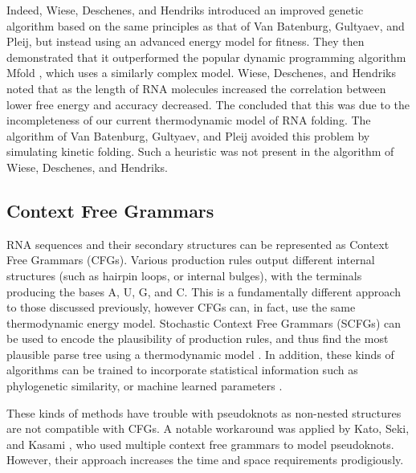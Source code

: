 \documentclass{cshonours}
\begin{document}
Indeed, Wiese, Deschenes, and Hendriks \cite{wiese2008rnapredict} introduced an improved
genetic algorithm based on the same principles as that of Van Batenburg, Gultyaev,
and Pleij, but instead using an advanced energy model for fitness. They then
demonstrated that it outperformed the popular dynamic programming algorithm
Mfold \cite{zuker2003mfold}, which uses a similarly complex model. Wiese, Deschenes, and Hendriks noted that as the length of RNA molecules increased the correlation between lower free energy and accuracy decreased. The concluded that this was due to the incompleteness of our current thermodynamic model of RNA folding. The algorithm of Van Batenburg, Gultyaev, and Pleij avoided this problem by simulating kinetic folding. Such a heuristic was not present in the algorithm of Wiese, Deschenes, and Hendriks.



\subsection{Context Free Grammars}
RNA sequences and their secondary structures can be represented as Context Free
Grammars (CFGs). Various production rules output different internal structures (such as
hairpin loops, or internal bulges), with the terminals producing the bases A, U, G,
and C. This is a fundamentally different approach to those discussed previously,
however CFGs can, in fact, use the same thermodynamic energy model. Stochastic Context Free Grammars (SCFGs) can be used to encode the plausibility of
production rules, and thus find the most plausible parse tree using a thermodynamic model \cite{rivas2012range}. In addition, these kinds of algorithms can be trained to
incorporate statistical information such as phylogenetic similarity, or machine
learned parameters \cite{rivas2012range}. 

These kinds of methods have trouble with pseudoknots as non-nested structures are not compatible with CFGs.
A notable workaround was applied by Kato, Seki, and Kasami \cite{kato2006stochastic}, who used
multiple context free grammars to model pseudoknots. However, their approach
increases the time and space requirements prodigiously.
\end{document}

